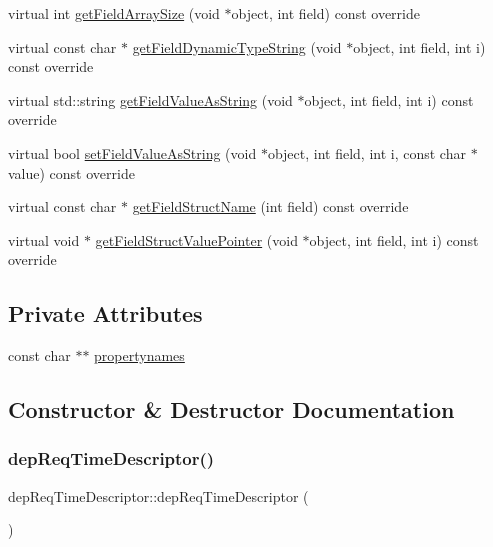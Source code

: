 \begin{DoxyCompactItemize}
virtual int \hyperlink{classdep_req_time_descriptor_a4d6a51a338076853385eb86d734319d4}{get\+Field\+Array\+Size} (void $\ast$object, int field) const override
\item 
virtual const char $\ast$ \hyperlink{classdep_req_time_descriptor_a8c3f7004d1d8f89cbb01bd7e827f1ad8}{get\+Field\+Dynamic\+Type\+String} (void $\ast$object, int field, int i) const override
\item 
virtual std\+::string \hyperlink{classdep_req_time_descriptor_a93ae2e8b0dece6757eabe758959988fd}{get\+Field\+Value\+As\+String} (void $\ast$object, int field, int i) const override
\item 
virtual bool \hyperlink{classdep_req_time_descriptor_a03a2b4c17daaad8eb395d571279dde51}{set\+Field\+Value\+As\+String} (void $\ast$object, int field, int i, const char $\ast$value) const override
\item 
virtual const char $\ast$ \hyperlink{classdep_req_time_descriptor_a5d68aab012514ac2d7f4649412b98ec0}{get\+Field\+Struct\+Name} (int field) const override
\item 
virtual void $\ast$ \hyperlink{classdep_req_time_descriptor_a886868d18593658df92a25dd43eedcaf}{get\+Field\+Struct\+Value\+Pointer} (void $\ast$object, int field, int i) const override
\end{DoxyCompactItemize}
\subsection*{Private Attributes}
\begin{DoxyCompactItemize}
\item 
const char $\ast$$\ast$ \hyperlink{classdep_req_time_descriptor_a8027018b5fe1aeb72652563cd2a9f505}{propertynames}
\end{DoxyCompactItemize}


\subsection{Constructor \& Destructor Documentation}
\mbox{\label{classdep_req_time_descriptor_a3a2e6770051714ad9759ccbf1943dbff}} 
\subsubsection{\texorpdfstring{dep\+Req\+Time\+Descriptor()}{depReqTimeDescriptor()}}
{\footnotesize\ttfamily dep\+Req\+Time\+Descriptor\+::dep\+Req\+Time\+Descriptor (\begin{DoxyParamCaption}{ }\end{DoxyParamCaption})}

